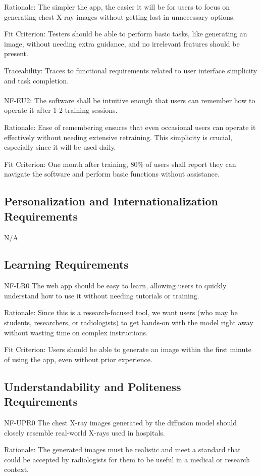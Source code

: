 \documentclass[12pt]{article}
\begin{document}
Rationale: The simpler the app, the easier it will be for users to focus on generating chest X-ray 
images without getting lost in unnecessary options.

Fit Criterion: Testers should be able to perform basic tasks, like generating an image, without 
needing extra guidance, and no irrelevant features should be present.

Traceability: Traces to functional requirements related to user interface simplicity and task 
completion.
\\\\
NF-EU2: The software shall be intuitive enough that users can remember how to operate it after 1-2 
training sessions.

Rationale: Ease of remembering ensures that even occasional users can operate it effectively 
without needing extensive retraining. This simplicity is crucial, especially since it will be used 
daily.

Fit Criterion: One month after training, 80\% of users shall report they can navigate the software 
and perform basic functions without assistance.
\subsection{Personalization and Internationalization Requirements}
N/A

\subsection{Learning Requirements}
NF-LR0 The web app should be easy to learn, allowing users to quickly understand how to use it 
without needing tutorials or training.

Rationale: Since this is a research-focused tool, we want users (who may be students, researchers, 
or radiologists) to get hands-on with the model right away without wasting time on complex 
instructions.

Fit Criterion: Users should be able to generate an image within the first minute of using the app, even without prior experience.

\subsection{Understandability and Politeness Requirements}
NF-UPR0 The chest X-ray images generated by the diffusion model should closely resemble real-world 
X-rays used in hospitals.

Rationale: The generated images must be realistic and meet a standard that could be accepted by 
radiologists for them to be useful in a medical or research context.
\end{document}
